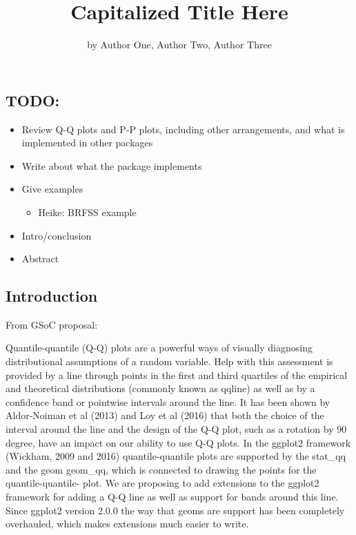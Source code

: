 \title{Capitalized Title Here}
\author{by Author One, Author Two, Author Three}

\maketitle


\subsection{TODO:}\label{todo}

\begin{itemize}
\tightlist
\item
  Review Q-Q plots and P-P plots, including other arrangements, and what
  is implemented in other packages
\item
  Write about what the package implements
\item
  Give examples

  \begin{itemize}
  \tightlist
  \item
    Heike: BRFSS example
  \end{itemize}
\item
  Intro/conclusion
\item
  Abstract
\end{itemize}

\subsection{Introduction}\label{introduction}

From GSoC proposal:

Quantile-quantile (Q-Q) plots are a powerful ways of visually diagnosing
distributional assumptions of a random variable. Help with this
assessment is provided by a line through points in the first and third
quartiles of the empirical and theoretical distributions (commonly known
as qqline) as well as by a confidence band or pointwise intervals around
the line. It has been shown by Aldor-Noiman et al (2013) and Loy et al
(2016) that both the choice of the interval around the line and the
design of the Q-Q plot, such as a rotation by 90 degree, have an impact
on our ability to use Q-Q plots. In the ggplot2 framework (Wickham, 2009
and 2016) quantile-quantile plots are supported by the stat\_qq and the
geom geom\_qq, which is connected to drawing the points for the
quantile-quantile- plot. We are proposing to add extensions to the
ggplot2 framework for adding a Q-Q line as well as support for bands
around this line. Since ggplot2 version 2.0.0 the way that geoms are
support has been completely overhauled, which makes extensions much
easier to write.

